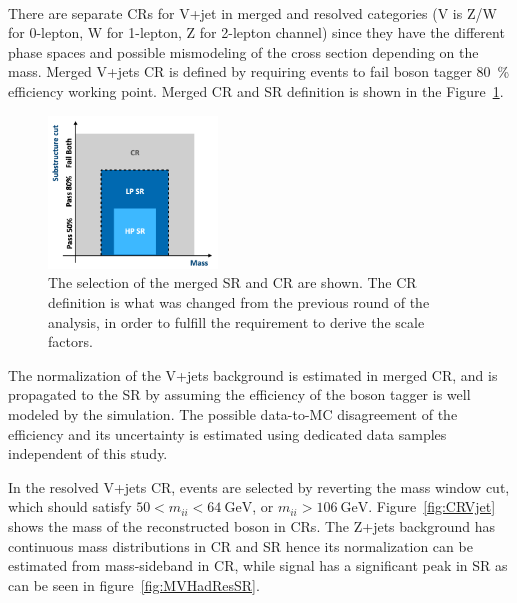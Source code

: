 \noindent\textbf{}  \\
There are separate CRs for V+jet in merged and resolved categories (V is Z/W for 0-lepton, W for 1-lepton, Z for 2-lepton channel) since they have the different phase spaces and possible mismodeling of the cross section depending on the mass.
Merged V+jets CR is defined by requiring events to fail boson tagger 80~\% efficiency working point. 
Merged CR and SR definition is shown in the Figure~\ref{fig:MergedRegion}.
\begin{figure}[H]
    \centering
    \includegraphics[width=0.4\textwidth]{figures/MergedRegion}
    \caption{The selection of the merged SR and CR are shown. The CR definition is what was changed from the previous round of the analysis, in order to fulfill the requirement to derive the scale factors.}
    \label{fig:MergedRegion}
\end{figure}
The normalization of the V+jets background is estimated in merged CR, and is propagated to the SR by assuming the efficiency of the boson tagger is well modeled by the simulation.
The possible data-to-MC disagreement of the efficiency and its uncertainty is estimated using dedicated data samples independent of this study. 

In the resolved V+jets CR, events are selected by reverting the mass window cut, which should satisfy $50<m_{i i}<64 ~\mathrm{GeV}$, or $m_{i i}>106 ~\mathrm{GeV}$. 
Figure~\ref{fig:CRVjet} shows the mass of the reconstructed boson in CRs. The Z+jets background has continuous mass distributions in CR and SR hence its normalization can be estimated from mass-sideband in CR, while signal has a significant peak in SR as can be seen in figure~\ref{fig:MVHadResSR}.

